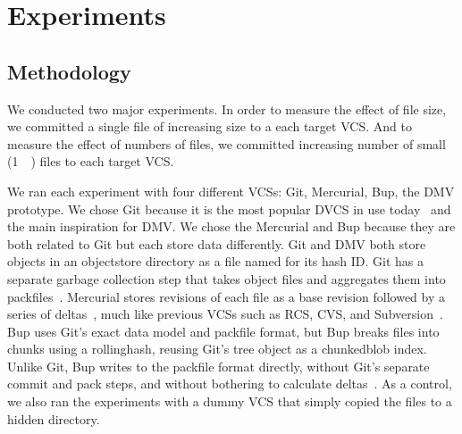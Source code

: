 \section{Experiments}

\subsection{Methodology}

We conducted two major experiments.
In order to measure the effect of file size, we committed a single file of increasing size to a each target \gls{VCS}.
And to measure the effect of numbers of files, we committed increasing number of small (\SI{1}{\kibi\byte}) files to each target \gls{VCS}.

We ran each experiment with four different \glspl{VCS}: Git, Mercurial, Bup, the DMV prototype.
We chose Git because it is the most popular \gls{DVCS} in use today~\cite{what_are_devs_talking_about} and the main inspiration for DMV.
We chose the Mercurial and Bup because they are both related to Git but each store data differently.
Git and DMV both store objects in an \gls{objectstore} directory as a file named for its hash ID.
Git has a separate garbage collection step that takes object files and aggregates them into \glspl{packfile}~\cite[Section 10.7]{git_book}.
Mercurial stores revisions of each file as a base revision followed by a series of deltas~\cite[Chapter 4]{hgbook}, much like previous \glspl{VCS} such as RCS, CVS, and Subversion~\cite{history_of_version_control}.
Bup uses Git's exact data model and \gls{packfile} format, but Bup breaks files into chunks using a \gls{rollinghash}, reusing Git's \gls{tree} object as a \gls{chunkedblob} index\footnotemark.
Unlike Git, Bup writes to the \gls{packfile} format directly, without Git's separate commit and pack steps, and without bothering to calculate deltas~\cite{bup_design}.
As a control, we also ran the experiments with a dummy \gls{VCS} that simply copied the files to a hidden directory.


